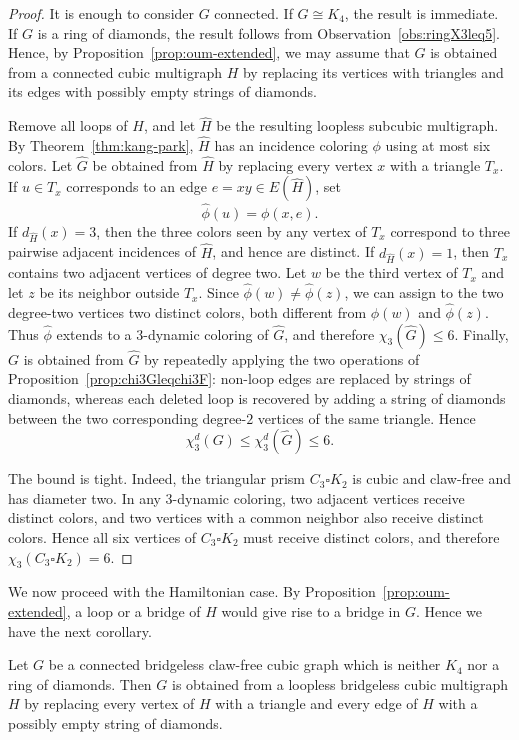 \begin{proof}
It is enough to consider $G$ connected. If $G\cong K_4$, the result is
immediate. If $G$ is a ring of diamonds, the result follows from
Observation~\ref{obs:ringX3leq5}. Hence, by
Proposition~\ref{prop:oum-extended}, we may assume that $G$ is obtained
from a connected cubic multigraph $H$ by replacing its vertices with
triangles and its edges with possibly empty strings of diamonds.

Remove all loops of $H$, and let $\widehat H$ be the resulting loopless
subcubic multigraph. By Theorem~\ref{thm:kang-park},
$\widehat H$ has an incidence coloring $\phi$ using at most six colors.
Let $\widehat G$ be obtained from $\widehat H$ by replacing every vertex
$x$ with a triangle $T_x$. If $u\in T_x$ corresponds to an edge
$e=xy\in E(\widehat H)$, set
\[
\widehat\phi(u)=\phi(x,e).
\]
If $d_{\widehat H}(x)=3$, then the three colors seen by any vertex of
$T_x$ correspond to three pairwise adjacent incidences of $\widehat H$,
and hence are distinct.
If $d_{\widehat H}(x)=1$, then $T_x$ contains two adjacent vertices of
degree two. Let $w$ be the third vertex of $T_x$ and let $z$ be its
neighbor outside $T_x$. Since $\widehat\phi(w)\neq\widehat\phi(z)$, we
can assign to the two degree-two vertices two distinct colors, both
different from $\widehat\phi(w)$ and $\widehat\phi(z)$. Thus
$\widehat\phi$ extends to a $3$-dynamic coloring of $\widehat G$, and
therefore
$
\chi_3(\widehat G)\leq 6.
$
Finally, $G$ is obtained from $\widehat G$ by repeatedly applying the
two operations of Proposition~\ref{prop:chi3Gleqchi3F}: non-loop edges
are replaced by strings of diamonds, whereas each deleted loop is
recovered by adding a string of diamonds between the two corresponding
degree-$2$ vertices of the same triangle. Hence
\[
\chi_3^d(G)\leq\chi_3^d(\widehat G)\leq6.
\]

The bound is tight. Indeed, the triangular prism $C_3\square K_2$ is
cubic and claw-free and has diameter two. In any $3$-dynamic coloring,
two adjacent vertices receive distinct colors, and two vertices with a
common neighbor also receive distinct colors. Hence all six vertices of
$C_3\square K_2$ must receive distinct colors, and therefore
$
\chi_3(C_3\square K_2)=6.
$
\end{proof}

We now proceed with the Hamiltonian case.
By Proposition~\ref{prop:oum-extended}, a loop or a
bridge of $H$ would give rise to a bridge in $G$.
Hence we have the next corollary.

\begin{corollary}\label{cor:oum-bridgeless}
Let $G$ be a connected bridgeless claw-free cubic graph which is neither
$K_4$ nor a ring of diamonds. Then $G$ is obtained from a loopless
bridgeless cubic multigraph $H$ by replacing every vertex of $H$ with
a triangle and every edge of $H$ with a possibly empty string of diamonds.
\end{corollary}

